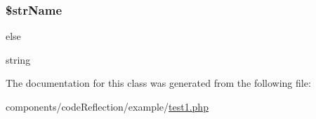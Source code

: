 \hypertarget{class_example_code_reflecion_90edf7538a74be8ac5ce46baaf203382}{
\subsubsection[{\$strName}]{\setlength{\rightskip}{0pt plus 5cm}\$strName}}
\label{class_example_code_reflecion_90edf7538a74be8ac5ce46baaf203382}


else

string 

The documentation for this class was generated from the following file:\begin{CompactItemize}
\item 
components/codeReflection/example/\hyperlink{code_reflection_2example_2test1_8php}{test1.php}\end{CompactItemize}
